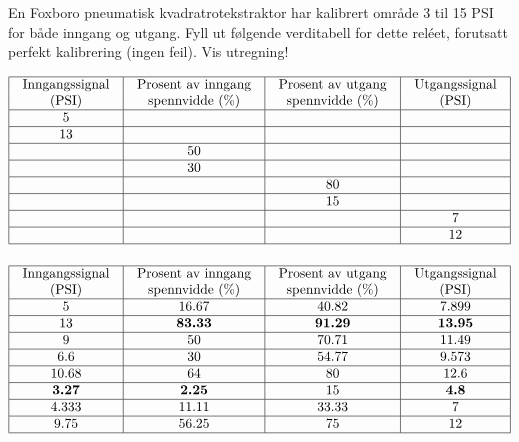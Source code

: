 
En Foxboro pneumatisk kvadratrotekstraktor har kalibrert område 3 til 15 PSI for både inngang og utgang. Fyll ut følgende verditabell for dette reléet, forutsatt perfekt kalibrering (ingen feil). Vis utregning!


$$\vbox{\offinterlineskip
\halign{\strut
\vrule \quad\hfil # \ \hfil & 
\vrule \quad\hfil # \ \hfil & 
\vrule \quad\hfil # \ \hfil & 
\vrule \quad\hfil # \ \hfil \vrule \cr
\noalign{\hrule}
%
Inngangssignal & Prosent av inngang & Prosent av utgang & Utgangssignal \cr
%
(PSI) & spennvidde (\%) & spennvidde (\%) & (PSI) \cr
%
\noalign{\hrule}
%
5 &  &  &  \cr
%
\noalign{\hrule}
%
13 &  &  &  \cr
%
\noalign{\hrule}
%
 & 50 &  &  \cr
%
\noalign{\hrule}
%
 & 30 &  &  \cr
%
\noalign{\hrule}
%
 &  & 80 &  \cr
%
\noalign{\hrule}
%
 &  & 15 &  \cr
%
\noalign{\hrule}
%
 &  &  & 7 \cr
%
\noalign{\hrule}
%
 &  &  & 12 \cr
%
\noalign{\hrule}
} %
}$$ %







$$\vbox{\offinterlineskip
\halign{\strut
\vrule \quad\hfil # \ \hfil & 
\vrule \quad\hfil # \ \hfil & 
\vrule \quad\hfil # \ \hfil & 
\vrule \quad\hfil # \ \hfil \vrule \cr
\noalign{\hrule}
%
Inngangssignal & Prosent av inngang & Prosent av utgang & Utgangssignal \cr
%
(PSI) & spennvidde (\%) & spennvidde (\%) & (PSI) \cr
%
\noalign{\hrule}
%
5 & 16.67 & 40.82 & 7.899 \cr
%
\noalign{\hrule}
%
13 & {\bf 83.33} & {\bf 91.29} & {\bf 13.95} \cr
%
\noalign{\hrule}
%
9 & 50 & 70.71 & 11.49 \cr
%
\noalign{\hrule}
%
6.6 & 30 & 54.77 & 9.573 \cr
%
\noalign{\hrule}
%
10.68 & 64 & 80 & 12.6 \cr
%
\noalign{\hrule}
%
{\bf 3.27} & {\bf 2.25} & 15 & {\bf 4.8} \cr
%
\noalign{\hrule}
%
4.333 & 11.11 & 33.33 & 7 \cr
%
\noalign{\hrule}
%
9.75 & 56.25 & 75 & 12 \cr
%
\noalign{\hrule}
} %
}$$ %

